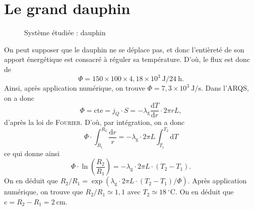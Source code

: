 \section{Le grand dauphin}

\begin{figure}[H]
	\centering
	
	\caption{Système étudiée : dauphin}
\end{figure}

On peut supposer que le dauphin ne se déplace pas, et donc l'entièreté de son apport énergétique est consacré à réguler sa température. D'où, le flux est donc de \[
	\Phi = 150 \times 100 \times 4{,}18 \times 10^3 \:\mathrm{J} / 24 \: \mathrm{h}.
\]
Ainsi, après application numérique, on trouve $\Phi = 7{,}3 \times 10^3 \: \mathrm{J / s}$.
Dans l'ARQS, on a donc \[
	\Phi = \mathrm{cte} = j_Q \cdot S = -\lambda_\mathrm{g} \frac{\mathrm{d}T}{\mathrm{d}r} \cdot 2\pi r L
,\] d'après la loi de \textsc{Fourier}.
D'où, par intégration, on a donc \[
	\Phi \cdot \int_{R_1}^{R_2} \frac{\mathrm{d}r}{r} = -\lambda_\mathrm{g} \cdot  2\pi L \int_{T_1}^{T_2}	\mathrm{d}T
\] ce qui donne ainsi \[
	\Phi \cdot \ln\left( \frac{R_2}{R_1} \right) = -\lambda_\mathrm{g} \cdot 2\pi L \cdot (T_2 - T_1).
\]
On en déduit que $R_2 / R_1 = \exp(\lambda_\mathrm{g} \cdot 2\pi L \cdot (T_2 - T_1) / \Phi)$.
Après application numérique, on trouve que $R_2 / R_1 \simeq 1{,}1$ avec $T_2 \simeq 18\:^\circ\mathrm{C}$.
On en déduit que $e = R_2 - R_1 = 2\:\mathrm{cm}$.
